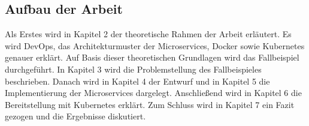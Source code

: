 \subsection{Aufbau der Arbeit}

Als Erstes wird in Kapitel 2 der theoretische Rahmen der Arbeit erläutert. Es wird DevOps, das Architekturmuster der Microservices, Docker sowie Kubernetes genauer erklärt. Auf Basis dieser theoretischen Grundlagen wird das Fallbeispiel durchgeführt. In Kapitel 3 wird die Problemstellung des Fallbeispieles beschrieben. Danach wird in Kapitel 4 der Entwurf und in Kapitel 5 die Implementierung der Microservices dargelegt. Anschließend wird in Kapitel 6 die Bereitstellung mit Kubernetes erklärt. Zum Schluss wird in Kapitel 7 ein Fazit gezogen und die Ergebnisse diskutiert.


